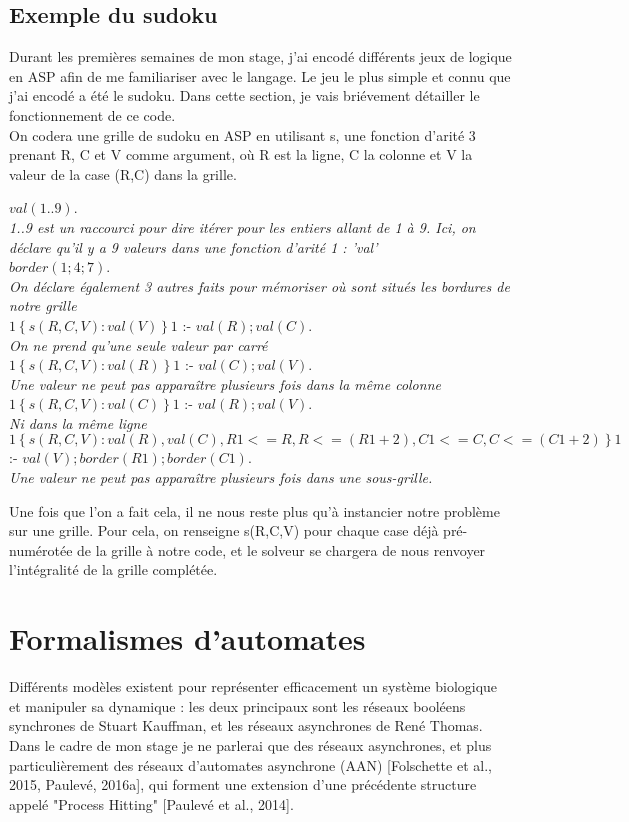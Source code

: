 \documentclass[12pt,a4paper]{article}
\begin{document}
\subsection{Exemple du sudoku}
Durant les premières semaines de mon stage, j'ai encodé différents jeux de logique en ASP afin de me familiariser avec le langage. Le jeu le plus simple et connu que j'ai encodé a été le sudoku. Dans cette section, je vais 
briévement détailler le fonctionnement de ce code.\\
On codera une grille de sudoku en ASP en utilisant s, une fonction d'arité 3 prenant R, C et V comme argument, où R est la ligne, C la colonne et V la valeur de la case (R,C) dans la grille.
\begin{center}
$val(1..9)$.\\
\emph{1..9 est un raccourci pour dire itérer pour les entiers allant de 1 à 9. Ici, on déclare qu'il y a 9 valeurs dans une fonction d'arité 1 : 'val'}\\
$border(1;4;7)$.\\
\emph{On déclare également 3 autres faits pour mémoriser où sont situés les bordures de notre grille}\\
$1\left\{ s(R,C,V): val(V) \right\}1$ :- $val(R) ; val(C)$.\\
\emph{On ne prend qu'une seule valeur par carré}\\
$1\left\{ s(R,C,V): val(R) \right\}1$ :- $val(C) ; val(V)$.\\
\emph{Une valeur ne peut pas apparaître plusieurs fois dans la même colonne}\\
$1\left\{ s(R,C,V): val(C) \right\}1$ :- $val(R) ; val(V)$.\\
\emph{Ni dans la même ligne}\\
$1\left\{ s(R,C,V): val(R), val(C), R1<=R, R<=(R1+2), C1<=C, C<=(C1+2)\right\}1$ :- $val(V) ; border(R1) ; border(C1)$.\\
\emph{Une valeur ne peut pas apparaître plusieurs fois dans une sous-grille.}\\
\end{center}
Une fois que l'on a fait cela, il ne nous reste plus qu'à instancier notre problème sur une grille. Pour cela, on renseigne s(R,C,V) pour chaque case déjà pré-numérotée de la grille à notre code, et le solveur se chargera 
de nous renvoyer l'intégralité de la grille complétée.

\section{Formalismes d'automates}
Différents modèles existent pour représenter efficacement un système biologique et manipuler sa dynamique : les deux principaux sont les réseaux booléens synchrones de Stuart Kauffman, et les réseaux asynchrones de René Thomas.
Dans le cadre de mon stage je ne parlerai que des réseaux asynchrones, et plus particulièrement des réseaux d'automates asynchrone (AAN) [Folschette et al., 2015, Paulevé, 2016a], qui forment une extension d'une précédente 
structure appelé "Process Hitting"  [Paulevé et al., 2014].
\end{document}
